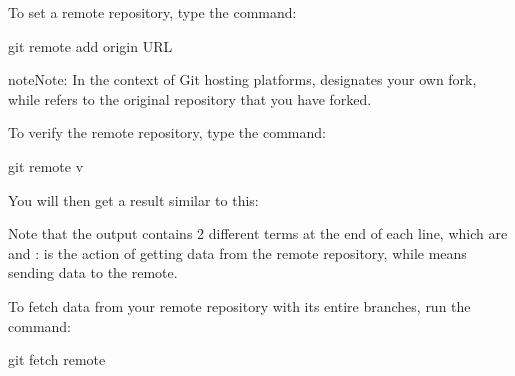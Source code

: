 \documentclass[a4paper,10pt,english,openany,oneside]{sphinxmanual}
\begin{document}
\sphinxAtStartPar
To set a remote repository, type the command:

\begin{sphinxVerbatim}[commandchars=\\\{\}]
\PYGZdl{} git remote add origin \PYGZlt{}URL\PYGZgt{}
\end{sphinxVerbatim}

\begin{sphinxadmonition}{note}{Note:}
\sphinxAtStartPar
In the context of Git hosting platforms,  designates your own fork, while  refers to the original repository that you have forked.
\end{sphinxadmonition}

\sphinxAtStartPar
To verify the remote repository, type the command:

\begin{sphinxVerbatim}[commandchars=\\\{\}]
\PYGZdl{} git remote \PYGZhy{}v
\end{sphinxVerbatim}

\sphinxAtStartPar
You will then get a result similar to this:

\begin{sphinxVerbatim}[commandchars=\\\{\}]
    
    
\end{sphinxVerbatim}

\sphinxAtStartPar
Note that the output contains 2 different terms at the end of each line, which are  and :  is the action of getting data from the remote repository, while  means sending data to the remote.

\sphinxAtStartPar
To fetch data from your remote repository with its entire branches, run the command:

\begin{sphinxVerbatim}[commandchars=\\\{\}]
\PYGZdl{} git fetch \PYGZlt{}remote\PYGZgt{}
\end{sphinxVerbatim}
\end{document}
